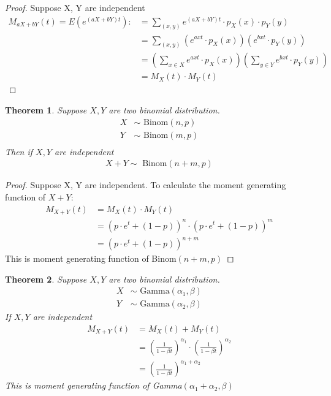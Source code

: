 \documentclass[11pt,oneside]{book}
\theoremstyle{break}
\theoremstyle{break}
\newtheorem{thm}{Theorem}[section]
\begin{document}
\begin{proof}
Suppose X, Y are independent
\begin{align*}
M_{aX+bY}(t)=E(e^{(aX+bY)t}):&=\sum_{(x,y)}e^{(aX+bY)t}\cdot p_X(x)\cdot p_Y(y)\\
&=\sum_{(x,y)}\left( e^{axt}\cdot p_X(x) \right) \left( e^{bxt}\cdot p_Y(y)  \right)\\
&=\left(\sum_{x\in X} e^{axt}\cdot p_X(x) \right) \left( \sum_{y\in Y} e^{bxt}\cdot p_Y(y)  \right)\\
&=M_X(t)\cdot M_Y(t)
\end{align*}
\end{proof}
\begin{thm}
Suppose $X,Y$ are two binomial distribution. \begin{align*}
X&\sim \text{ Binom}(n,p)\\
Y&\sim \text{ Binom}(m,p)\\
\end{align*}
Then if $X,Y$ are independent\begin{align*}
X+Y\sim \text{ Binom}(n+m,p)
\end{align*}
\end{thm}
\begin{proof}
Suppose X, Y are independent. To calculate the moment generating function of $X+Y:$\begin{align*}
M_{X+Y}(t)&=M_{X}(t)\cdot M_{Y}(t)\\
&=\left(p\cdot e^{t}+(1-p) \right)^n\cdot \left(p\cdot e^{t}+(1-p) \right)^{m}\\
&=\left(p\cdot e^{t}+(1-p) \right)^{n+m}
\end{align*}
This is moment generating function of Binom$(n+m,p)$
\end{proof}
\begin{thm}
Suppose $X,Y$ are two binomial distribution. \begin{align*}
X&\sim \text{ Gamma}(\alpha_1,\beta)\\
Y&\sim \text{ Gamma}(\alpha_2,\beta)
\end{align*}
If $X,Y$ are independent \begin{align*}
M_{X+Y}(t)&=M_{X}(t)+M_{Y}(t)\\
&=\left(\frac{1}{1-\beta t} \right)^{\alpha_1}\cdot \left(\frac{1}{1-\beta t} \right)^{\alpha_2}\\
&=\left(\frac{1}{1-\beta t} \right)^{\alpha_1+\alpha_2}
\end{align*}
This is moment generating function of Gamma$(\alpha_1+\alpha_2,\beta)$
\end{thm}
\end{document}
